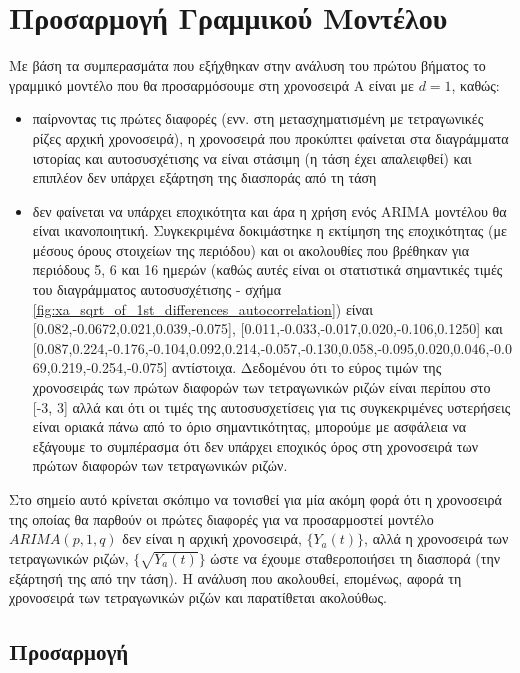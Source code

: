\chapter{Προσαρμογή Γραμμικού Μοντέλου}
\label{ch:step2}
\thispagestyle{fancy}

Με βάση τα συμπερασμάτα που εξήχθηκαν στην ανάλυση του πρώτου βήματος το γραμμικό μοντέλο που θα προσαρμόσουμε στη χρονοσειρά Α είναι  με $d=1$, καθώς:
\begin{itemize}
    \item παίρνοντας τις πρώτες διαφορές (ενν. στη μετασχηματισμένη με τετραγωνικές ρίζες αρχική χρονοσειρά), η χρονοσειρά που προκύπτει φαίνεται στα διαγράμματα ιστορίας και αυτοσυσχέτισης να είναι στάσιμη (η τάση έχει απαλειφθεί) και επιπλέον δεν υπάρχει εξάρτηση της διασποράς από τη τάση
    \item δεν φαίνεται να υπάρχει εποχικότητα και άρα η χρήση ενός ARIMA μοντέλου θα είναι ικανοποιητική. Συγκεκριμένα δοκιμάστηκε η εκτίμηση της εποχικότητας (με μέσους όρους στοιχείων της περιόδου) και οι ακολουθίες που βρέθηκαν για περιόδους 5, 6 και 16 ημερών (καθώς αυτές είναι οι στατιστικά σημαντικές τιμές του διαγράμματος αυτοσυσχέτισης - σχήμα \ref{fig:xa_sqrt_of_1st_differences_autocorrelation}) είναι [0.082,-0.0672,0.021,0.039,-0.075], [0.011,-0.033,-0.017,0.020,-0.106,0.1250] και [0.087,0.224,-0.176,-0.104,0.092,0.214,-0.057,-0.130,0.058,-0.095,0.020,0.046,-0.069,0.219,-0.254,-0.075] αντίστοιχα. Δεδομένου ότι το εύρος τιμών της χρονοσειράς των πρώτων διαφορών των τετραγωνικών ριζών είναι περίπου στο [-3, 3] αλλά και ότι οι τιμές της αυτοσυσχετίσεις για τις συγκεκριμένες υστερήσεις είναι οριακά πάνω από το όριο σημαντικότητας, μπορούμε με ασφάλεια να εξάγουμε το συμπέρασμα ότι δεν υπάρχει εποχικός όρος στη χρονοσειρά των πρώτων διαφορών των τετραγωνικών ριζών.
\end{itemize}

Στο σημείο αυτό κρίνεται σκόπιμο να τονισθεί για μία ακόμη φορά ότι η χρονοσειρά της οποίας θα παρθούν οι πρώτες διαφορές για να προσαρμοστεί μοντέλο $ARIMA(p,1,q)$ δεν είναι η αρχική χρονοσειρά, $\{Y_a(t)\}$, αλλά η χρονοσειρά των τετραγωνικών ριζών, $\{\sqrt{Y_a(t)}\}$ ώστε να έχουμε σταθεροποιήσει τη διασπορά (την εξάρτησή της από την τάση). Η ανάλυση που ακολουθεί, επομένως, αφορά τη χρονοσειρά των τετραγωνικών ριζών και παρατίθεται ακολούθως.

\section{Προσαρμογή }

